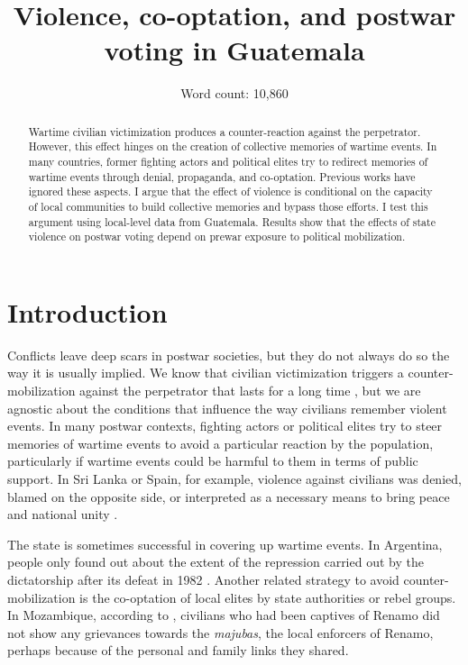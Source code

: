 \documentclass[12pt, notitlepage]{article}
\title{\Large Violence, co-optation, and postwar voting in Guatemala}
\author{}
\date{Word count: 10,860}
\begin{document}
\maketitle
\thispagestyle{empty}

\vspace{30pt}

\begin{abstract}

Wartime civilian victimization produces a counter-reaction against the perpetrator. However, this effect hinges on the creation of collective memories of wartime events. In many countries, former fighting actors and political elites try to redirect memories of wartime events through denial, propaganda, and co-optation. Previous works have ignored these aspects. I argue that the effect of violence is conditional on the capacity of local communities to build collective memories and bypass those efforts. I test this argument using local-level data from Guatemala. Results show that the effects of state violence on postwar voting depend on prewar exposure to political mobilization.

\end{abstract}

\newpage
\setcounter{page}{1}

\section*{Introduction}

Conflicts leave deep scars in postwar societies, but they do not always do so the way it is usually implied.
We know that civilian victimization triggers a counter-mobilization against the perpetrator that lasts for a long time \citep{Balcells:2012aa, Lupu:2017aa, Fontana:2017aa, Rozenas:2017aa, Rozenas:2019aa}, but we are agnostic about the conditions that influence the way civilians remember violent events.
In many postwar contexts, fighting actors or political elites try to steer memories of wartime events to avoid a particular reaction by the population, particularly if wartime events could be harmful to them in terms of public support.
In Sri Lanka or Spain, for example, violence against civilians was denied, blamed on the opposite side, or interpreted as a necessary means to bring peace and national unity \citep{Seoighe:2017aa, Palomares:2004aa}.

The state is sometimes successful in covering up wartime events.
In Argentina, people only found out about the extent of the repression carried out by the dictatorship after its defeat in 1982 \citep{Robben:1995aa}.
Another related strategy to avoid counter-mobilization is the co-optation of local elites by state authorities or rebel groups.
In Mozambique, according to \citet{Finnegan:1992aa}, civilians who had been captives of Renamo did not show any grievances towards the \textit{majubas}, the local enforcers of Renamo, perhaps because of the personal and family links they shared.
\end{document}
